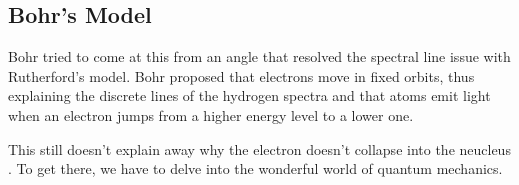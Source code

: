 \subsection{Bohr's Model}

Bohr tried to come at this from an angle that resolved the spectral line issue with Rutherford's model.
Bohr proposed that electrons move in fixed orbits, thus explaining the discrete lines of the hydrogen spectra and that atoms emit light when an electron jumps from a higher energy level to a lower one.

This still doesn't explain away why the electron doesn't collapse into the neucleus .
To get there, we have to delve into the wonderful world of quantum mechanics.
